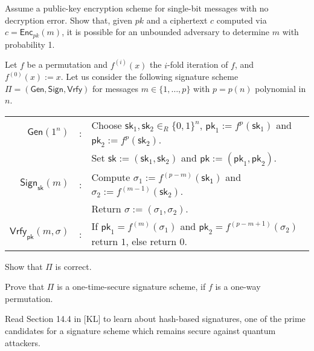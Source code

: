 \documentclass[a4paper,10pt,landscape,twocolumn]{scrartcl}
\begin{document}
\begin{bonusexercise}
	Assume a public-key encryption scheme for single-bit messages with no
	decryption error. Show that, given $pk$ and a ciphertext $c$ computed via
	$c=\mathsf{Enc}_{pk}(m)$, it is possible for an unbounded adversary to determine
	$m$ with probability 1.
\end{bonusexercise}


\begin{bonusexercise}
Let $f$ be a permutation and $f^{(i)}(x)$ the $i$-fold iteration of $f$,
and $f^{(0)}(x) := x$. Let us consider the following signature scheme
$\Pi = (\mathsf{Gen},\mathsf{Sign},\mathsf{Vrfy})$ for messages $m \in \{1, \ldots, p\}$ with $p = p(n)$ polynomial in $n$.
\begin{center}\vspace{-1em}
\begin{tabular}{rcl}
  $\mathsf{Gen}(1^n)$ & : &
    Choose $\mathsf{sk}_1,\mathsf{sk}_2 \in_R \{0,1\}^n$, $\mathsf{pk}_1 := f^p(\mathsf{sk}_1)$ and $\mathsf{pk}_2 := f^p(\mathsf{sk}_2)$. \\
    & & Set $\mathsf{sk} := (\mathsf{sk}_1,\mathsf{sk}_2)$ and $\mathsf{pk} := (\mathsf{pk}_1,\mathsf{pk}_2)$.\\[5pt]
  $\mathsf{Sign}_{\mathsf{sk}}(m)$ & : &
    Compute $\sigma_1 := f^{(p-m)}(\mathsf{sk_1})$ and $\sigma_2 := f^{(m-1)}(\mathsf{sk}_2)$.\\
    && Return $\sigma := (\sigma_1,\sigma_2)$.\\[5pt]
  $\mathsf{Vrfy}_{\mathsf{pk}}(m,\sigma)$ & : &
    If $\mathsf{pk}_1 =
  f^{(m)}(\sigma_1)$ and $\mathsf{pk}_2 = f^{(p-m+1)}(\sigma_2)$ return $1$,
  else return $0$.
\end{tabular}
\end{center}
\begin{subex}
Show that $\Pi$ is correct.
\end{subex}
\begin{subex}
Prove that $\Pi$ is a one-time-secure signature scheme, if
  $f$ is a one-way permutation.
\end{subex}
\end{bonusexercise}

\begin{bonusexercise}
Read Section 14.4 in [KL] to learn about hash-based signatures, one of the prime candidates for a signature scheme which remains secure against quantum attackers.
\end{bonusexercise}
\end{document}
